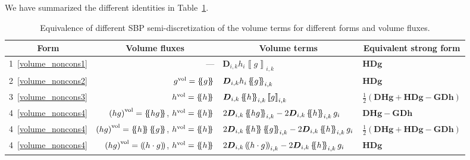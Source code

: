 \documentclass[]{scrartcl}
\newcommand*{\ldblbrace}{\{\mskip-5mu \left \{}
\newcommand*{\rdblbrace}{ \}\mskip-5mu \right \}}
\newcommand{\mean}[1]{\left\ldblbrace #1 \right\rdblbrace}
\newcommand*{\ldblparen}{(\mskip-3mu \left (}
\newcommand*{\rdblparen}{ )\mskip-3mu \right )}
\newcommand{\prodmean}[1]{\left\ldblparen #1 \right\rdblparen}
\newcommand{\mtx}[1]{\boldsymbol{#1}}
\renewcommand{\vec}[1]{\boldsymbol{#1}}
\newcommand{\jump}[1]{\left\llbracket #1  \right\rrbracket}
\theoremstyle{definition}
\begin{document}
We have summarized the different identities in Table~\ref{table_identities_splitforms}.
\begin{table}[htbp]
\centering
  \caption{Equivalence of different SBP semi-discretization of the volume terms for different forms and volume fluxes.}
  \label{table_identities_splitforms}
  \centering
  \footnotesize
    \begin{tabular}{c rll}
      \toprule
      \multicolumn{1}{c}{Form}
      & \multicolumn{1}{c}{Volume fluxes}
      & \multicolumn{1}{c}{Volume terms}
      & \multicolumn{1}{c}{Equivalent strong form}\\
      \midrule
1~\eqref{volume_noncons1} & ---\hspace{0.2cm}
& $\mtx{D}_{i,k} h_i \jump{g}_{i,k}$
& $\vec{H} \vec{D} \vec{g}$
\\
2~\eqref{volume_noncons2} & $g^{\mathrm{vol}} = \mean{g}$
& $\mtx{D}_{i,k} h_i \mean{g}_{i,k}$
& $\vec{H} \mtx{D} \vec{g}$
\\
3~\eqref{volume_noncons3} & $h^{\mathrm{vol}} = \mean{h}$
& $\mtx{D}_{i,k} \mean{h}_{i,k}\jump{g}_{i,k}$
& $\frac{1}{2} \left (\mtx{D} \vec{H} \vec{g} + \vec{H}  \mtx{D} \vec{g} - \vec{G} \mtx{D} \vec{h} \right )$
\\
4~\eqref{volume_noncons4} & $\left ( h g \right )^{\mathrm{vol}} = \mean{hg}$, $h^{\mathrm{vol}} = \mean{h}$
& $2 \mtx{D}_{i,k} \mean{hg}_{i,k} - 2 \mtx{D}_{i,k} \mean{h}_{i,k} g_i$
& $\mtx{D} \vec{H}\vec{g} - \vec{G} \mtx{D} \vec{h}$    \\
4~\eqref{volume_noncons4} & $\left ( h g \right )^{\mathrm{vol}} = \mean{h}\mean{g}$, $h^{\mathrm{vol}} = \mean{h}$
& $2 \mtx{D}_{i,k} \mean{h}\mean{g}_{i,k} - 2 \mtx{D}_{i,k} \mean{h}_{i,k} g_i$
& $\frac{1}{2} \left (\mtx{D} \vec{H} \vec{g} + \vec{H}  \mtx{D} \vec{g} - \vec{G} \mtx{D} \vec{h} \right )$\\
4~\eqref{volume_noncons4} & $\left ( h g \right )^{\mathrm{vol}} = \prodmean{h \cdot g}$, $h^{\mathrm{vol}} = \mean{h}$
& $2 \mtx{D}_{i,k} \prodmean{h \cdot g}_{i,k} - 2 \mtx{D}_{i,k} \mean{h}_{i,k} g_i$
& $\vec{H} \mtx{D} \vec{g}$
\\
      \bottomrule
    \end{tabular}
\end{table}
\end{document}
